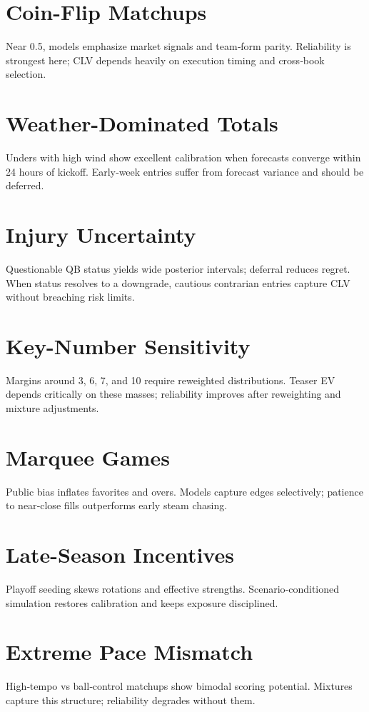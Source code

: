 \documentclass[12pt]{report}  %
\numberwithin{equation}{section}
\theoremstyle{plain}
\theoremstyle{definition}
\theoremstyle{remark}
\begin{document}
\section{Coin-Flip Matchups}
Near 0.5, models emphasize market signals and team‑form parity. Reliability is strongest here; CLV depends heavily on execution timing and cross‑book selection.

\section{Weather-Dominated Totals}
Unders with high wind show excellent calibration when forecasts converge within 24 hours of kickoff. Early‑week entries suffer from forecast variance and should be deferred.

\section{Injury Uncertainty}
Questionable QB status yields wide posterior intervals; deferral reduces regret. When status resolves to a downgrade, cautious contrarian entries capture CLV without breaching risk limits.

\section{Key-Number Sensitivity}
Margins around 3, 6, 7, and 10 require reweighted distributions. Teaser EV depends critically on these masses; reliability improves after reweighting and mixture adjustments.

\section{Marquee Games}
Public bias inflates favorites and overs. Models capture edges selectively; patience to near‑close fills outperforms early steam chasing.

\section{Late-Season Incentives}
Playoff seeding skews rotations and effective strengths. Scenario‑conditioned simulation restores calibration and keeps exposure disciplined.

\section{Extreme Pace Mismatch}
High‑tempo vs ball‑control matchups show bimodal scoring potential. Mixtures capture this structure; reliability degrades without them.
\end{document}
